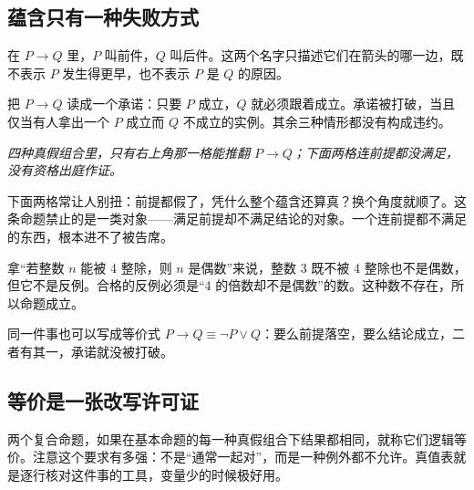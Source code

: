 \subsection{蕴含只有一种失败方式}

在 \(P\to Q\) 里，\(P\) 叫前件，\(Q\) 叫后件。这两个名字只描述它们在箭头的哪一边，既不表示 \(P\) 发生得更早，也不表示 \(P\) 是 \(Q\) 的原因。

把 \(P\to Q\) 读成一个承诺：只要 \(P\) 成立，\(Q\) 就必须跟着成立。承诺被打破，当且仅当有人拿出一个 \(P\) 成立而 \(Q\) 不成立的实例。其余三种情形都没有构成违约。

\begin{center}

\emph{四种真假组合里，只有右上角那一格能推翻 \(P\to Q\)；下面两格连前提都没满足，没有资格出庭作证。}
\end{center}

下面两格常让人别扭：前提都假了，凭什么整个蕴含还算真？换个角度就顺了。这条命题禁止的是一类对象——满足前提却不满足结论的对象。一个连前提都不满足的东西，根本进不了被告席。

拿``若整数 \(n\) 能被 4 整除，则 \(n\) 是偶数''来说，整数 3 既不被 4 整除也不是偶数，但它不是反例。合格的反例必须是``4 的倍数却不是偶数''的数。这种数不存在，所以命题成立。

同一件事也可以写成等价式 \(P\to Q\equiv\neg P\lor Q\)：要么前提落空，要么结论成立，二者有其一，承诺就没被打破。

\subsection{等价是一张改写许可证}

两个复合命题，如果在基本命题的每一种真假组合下结果都相同，就称它们逻辑等价。注意这个要求有多强：不是``通常一起对''，而是一种例外都不允许。真值表就是逐行核对这件事的工具，变量少的时候极好用。

